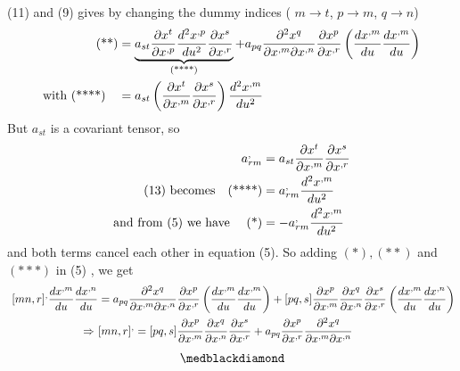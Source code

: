 (11) and (9) gives by changing the dummy indices ( $m\rightarrow t$, $p\rightarrow m$, $q\rightarrow n$)
\begin{align}
\text{(**)}&= \underbrace{a_{st}\pdv{x^t}{x^{,p}}\dv[2]{x^{,p}}{u}\pdv{x^s}{x^{,r}}}_\text{(****)}+a_{pq}\pdv{x^q}{x^{,m}}{x^{,n}}\pdv{x^{p}}{x^{,r}}\left(\dv{x^{,m}}{u}\dv{x^{,m}}{u}\right) \\
\text{with (****)}\quad &= a_{st}\left(\pdv{x^t}{x^{,m}}\pdv{x^s}{x^{,r}}\right)\dv[2]{x^{,m}}{u}
\end{align}
But $a_{st}$  is a covariant tensor, so
\begin{align}
\ a^{,}_{rm} &= a_{st}\pdv{x^t}{x^{,m}}\pdv{x^s}{x^{,r}}\\
\text{(13) becomes}\quad \text{(****)} &= a^{,}_{rm}\dv[2]{x^{,m}}{u}\\
\text{and from (5) we have }\quad \text{(*)} &= -a^{,}_{rm}\dv[2]{x^{,m}}{u}\\
\end{align}
and both terms cancel each other in equation (5). So adding $(*), (**)$ and $(***)$ in (5) , we get 
\begin{align}
\ [mn,r]^, \dv{x^{,m}}{u}\dv{x^{,n}}{u} &= a_{pq}\pdv{x^q}{x^{,m}}{x^{,n}}\pdv{x^{p}}{x^{,r}}\left(\dv{x^{,m}}{u}\dv{x^{,m}}{u}\right)+[pq,s]\pdv{x^p}{x^{,m}}\pdv{x^q}{x^{,n}}\pdv{x^s}{x^{,r}}\left(\dv{x^{,m}}{u}\dv{x^{,n}}{u}\right)\\
\Rightarrow \ &[mn,r]^, =[pq,s]\pdv{x^p}{x^{,m}}\pdv{x^q}{x^{,n}}\pdv{x^s}{x^{,r}}+  a_{pq}\pdv{x^{p}}{x^{,r}}\pdv{x^q}{x^{,m}}{x^{,n}}
\end{align}
$$\medblackdiamond$$
\newpage